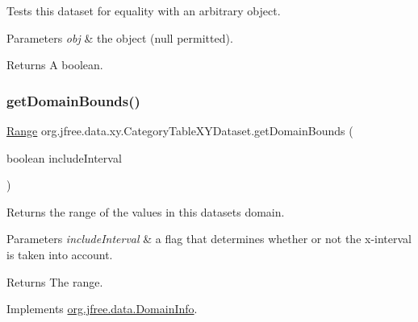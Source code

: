 Tests this dataset for equality with an arbitrary object.


\begin{DoxyParams}{Parameters}
{\em obj} & the object ({\ttfamily null} permitted).\\
\hline
\end{DoxyParams}
\begin{DoxyReturn}{Returns}
A boolean. 
\end{DoxyReturn}
\mbox{\label{classorg_1_1jfree_1_1data_1_1xy_1_1_category_table_x_y_dataset_a11cf2d528ab14a6d2affc68ff258d9e4}} 
\subsubsection{\texorpdfstring{get\+Domain\+Bounds()}{getDomainBounds()}}
{\footnotesize\ttfamily \mbox{\hyperlink{classorg_1_1jfree_1_1data_1_1_range}{Range}} org.\+jfree.\+data.\+xy.\+Category\+Table\+X\+Y\+Dataset.\+get\+Domain\+Bounds (\begin{DoxyParamCaption}\item[{boolean}]{include\+Interval }\end{DoxyParamCaption})}

Returns the range of the values in this dataset\textquotesingle{}s domain.


\begin{DoxyParams}{Parameters}
{\em include\+Interval} & a flag that determines whether or not the x-\/interval is taken into account.\\
\hline
\end{DoxyParams}
\begin{DoxyReturn}{Returns}
The range. 
\end{DoxyReturn}


Implements \mbox{\hyperlink{interfaceorg_1_1jfree_1_1data_1_1_domain_info_aeb90c8bc6d27c82c39abc99622846732}{org.\+jfree.\+data.\+Domain\+Info}}.

\mbox{\label{classorg_1_1jfree_1_1data_1_1xy_1_1_category_table_x_y_dataset_aef047ab681bbb08115dc9769f5bcb52a}} 
